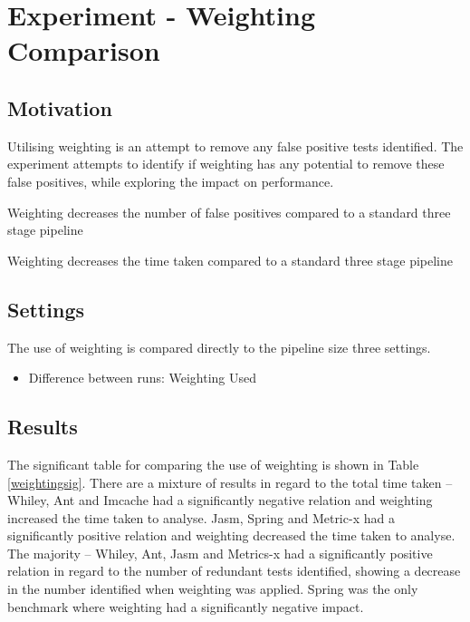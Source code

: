 \section{Experiment  - Weighting Comparison}
\label{sec:weight}

\subsection{Motivation}
Utilising weighting is an attempt to remove any false positive tests identified. The experiment attempts to identify if weighting has any potential to remove these false positives, while exploring the impact on performance.

\begin{hyp}
Weighting decreases the number of false positives compared to a standard three stage pipeline
\end{hyp}

\begin{hyp}
Weighting decreases the time taken compared to a standard three stage pipeline
\end{hyp}

\subsection{Settings}
The use of weighting is compared directly to the pipeline size three settings.

\begin{itemize}
\item Difference between runs: Weighting Used
\end{itemize}

\subsection{Results}
The significant table for comparing the use of weighting is shown in Table \ref{weightingsig}. There are a mixture of results in regard to the total time taken -- Whiley, Ant and Imcache had a significantly negative relation and weighting increased the time taken to analyse. Jasm, Spring and Metric-x had a significantly positive relation and weighting decreased the time taken to analyse. The majority -- Whiley, Ant, Jasm and Metrics-x had a significantly positive relation in regard to the number of redundant tests identified, showing a decrease in the number identified when weighting was applied. Spring was the only benchmark where weighting had a significantly negative impact.


